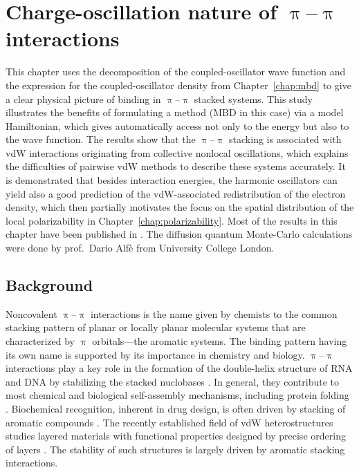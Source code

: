 \chapter{Charge-oscillation nature of $\uppi$--$\uppi$ interactions}\label{chap:pi-pi}

{\sffamily{} This chapter uses the decomposition of the coupled-oscillator wave function and the expression for the coupled-oscillator density from Chapter~\ref{chap:mbd} to give a clear physical picture of binding in $\uppi$--$\uppi$ stacked systems.
This study illustrates the benefits of formulating a method (MBD in this case) via a model Hamiltonian, which gives automatically access not only to the energy but also to the wave function.
The results show that the $\uppi$--$\uppi$ stacking is associated with vdW interactions originating from collective nonlocal oscillations, which explains the difficulties of pairwise vdW methods to describe these systems accurately.
It is demonstrated that besides interaction energies, the harmonic oscillators can yield also a good prediction of the vdW-associated redistribution of the electron density, which then partially motivates the focus on the spatial distribution of the local polarizability in Chapter~\ref{chap:polarizability}.
Most of the results in this chapter have been published in \citep{HermannNC17}.
The diffusion quantum Monte-Carlo calculations were done by prof.\ Dario Alfè from University College London.
}

\section{Background}

Noncovalent $\uppi$--$\uppi$ interactions is the name given by chemists to the common stacking pattern of planar or locally planar molecular systems that are characterized by $\uppi$ orbitals---the aromatic systems.
The binding pattern having its own name is supported by its importance in chemistry and biology.
$\uppi$--$\uppi$ interactions play a key role in the formation of the double-helix structure of RNA and DNA by stabilizing the stacked nuclobases \citep{HunterJMB93}.
In general, they contribute to most chemical and biological self-assembly mechanisms, including protein folding \citep{ArigaSTAM08,ZhangNB03}.
Biochemical recognition, inherent in drug design, is often driven by stacking of aromatic compounds \citep{MeyerACIE03}.
The recently established field of vdW heterostructures studies layered materials with functional properties designed by precise ordering of layers \citep{GeimN13}.
The stability of such structures is largely driven by aromatic stacking interactions.

